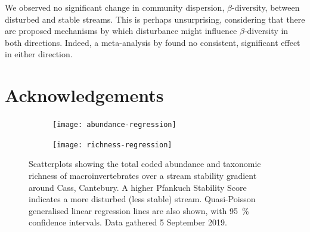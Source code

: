 \documentclass[a4paper,10pt]{article}
\newcommand\datadate{5 September 2019} %
\begin{document}
We observed no significant change in community dispersion, $\beta$-diversity, between disturbed and stable streams.
This is perhaps unsurprising, considering that there are proposed mechanisms by which disturbance might influence $\beta$-diversity in both directions.
Indeed, a meta-analysis by \textcite{disturbance-beta-meta} found no consistent, significant effect in either direction.

\section*{Acknowledgements}

\clearpage

\begin{figure}[p]
	\centering
	\begin{subfigure}[t]{\textwidth}
		\centering
		\texttt{[image: abundance-regression]}
		\caption{}\label{fig:abundance-regression}
	\end{subfigure}
	\begin{subfigure}[t]{\textwidth}
		\centering
		\texttt{[image: richness-regression]}
		\caption{}\label{fig:richness-regression}
	\end{subfigure}
	\caption[Regression plots]{ %
		Scatterplots showing the total coded abundance and taxonomic richness of macroinvertebrates over a stream stability gradient around Cass, Cantebury.
		A higher Pfankuch Stability Score indicates a more disturbed (less stable) stream.
		Quasi-Poisson generalised linear regression lines are also shown, with \SI{95}{\percent} confidence intervals.
		Data gathered {\datadate}.
	}\label{fig:regressions}
\end{figure}
\end{document}
